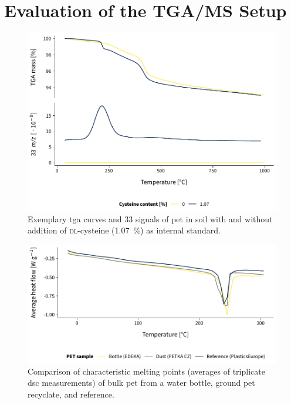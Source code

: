 
\chapter{Evaluation of the TGA/MS Setup}
\label{ap:tga-ms-method}

\begin{figure}
	\includegraphics[width=\textwidth]{figures/cysteine-comparison}
	\caption[Exemplary \ac{tga} curves and \SI{33}{\mz} signals of \ac{pet} in soil with and without \textsc{dl}-cysteine as internal standard.]{Exemplary \ac{tga} curves and \SI{33}{\mz} signals of \ac{pet} in soil with and without addition of \textsc{dl}-cysteine (\SI{1.07}{\percent}) as internal standard.}
	\label{fig:cysteine-comparison}
\end{figure}

\begin{figure}
	\includegraphics[width=\textwidth]{figures/dsc}
	\caption[Comparison of characteristic melting points of bulk \ac{pet} from a water bottle, ground \ac{pet} recyclate, and  reference.]{Comparison of characteristic melting points (averages of triplicate \ac{dsc} measurements) of bulk \ac{pet} from a water bottle, ground \ac{pet} recyclate, and  reference.}
	\label{fig:dsc}
\end{figure}

